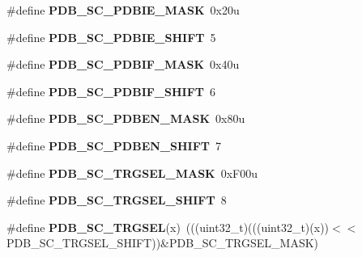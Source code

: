\begin{DoxyCompactItemize}
\item 
\#define {\bfseries P\+D\+B\+\_\+\+S\+C\+\_\+\+P\+D\+B\+I\+E\+\_\+\+M\+A\+SK}~0x20u\hypertarget{group__PDB__Register__Masks_ga153222e454507310871a217b8ede92fd}{}\label{group__PDB__Register__Masks_ga153222e454507310871a217b8ede92fd}

\item 
\#define {\bfseries P\+D\+B\+\_\+\+S\+C\+\_\+\+P\+D\+B\+I\+E\+\_\+\+S\+H\+I\+FT}~5\hypertarget{group__PDB__Register__Masks_ga8632d420c92ec79e08c43f7d3acc79cf}{}\label{group__PDB__Register__Masks_ga8632d420c92ec79e08c43f7d3acc79cf}

\item 
\#define {\bfseries P\+D\+B\+\_\+\+S\+C\+\_\+\+P\+D\+B\+I\+F\+\_\+\+M\+A\+SK}~0x40u\hypertarget{group__PDB__Register__Masks_ga57cd111abf2b5780daddb6619498ef7a}{}\label{group__PDB__Register__Masks_ga57cd111abf2b5780daddb6619498ef7a}

\item 
\#define {\bfseries P\+D\+B\+\_\+\+S\+C\+\_\+\+P\+D\+B\+I\+F\+\_\+\+S\+H\+I\+FT}~6\hypertarget{group__PDB__Register__Masks_ga98ea01f76c8cc1bc944830d4d8387118}{}\label{group__PDB__Register__Masks_ga98ea01f76c8cc1bc944830d4d8387118}

\item 
\#define {\bfseries P\+D\+B\+\_\+\+S\+C\+\_\+\+P\+D\+B\+E\+N\+\_\+\+M\+A\+SK}~0x80u\hypertarget{group__PDB__Register__Masks_ga5582f0b88e7ae5e9dcf69f3a859c4470}{}\label{group__PDB__Register__Masks_ga5582f0b88e7ae5e9dcf69f3a859c4470}

\item 
\#define {\bfseries P\+D\+B\+\_\+\+S\+C\+\_\+\+P\+D\+B\+E\+N\+\_\+\+S\+H\+I\+FT}~7\hypertarget{group__PDB__Register__Masks_ga019fc7af809a6f3945ac3c131b90432a}{}\label{group__PDB__Register__Masks_ga019fc7af809a6f3945ac3c131b90432a}

\item 
\#define {\bfseries P\+D\+B\+\_\+\+S\+C\+\_\+\+T\+R\+G\+S\+E\+L\+\_\+\+M\+A\+SK}~0x\+F00u\hypertarget{group__PDB__Register__Masks_ga8950a99a799e9a49b602a679a64cc2e0}{}\label{group__PDB__Register__Masks_ga8950a99a799e9a49b602a679a64cc2e0}

\item 
\#define {\bfseries P\+D\+B\+\_\+\+S\+C\+\_\+\+T\+R\+G\+S\+E\+L\+\_\+\+S\+H\+I\+FT}~8\hypertarget{group__PDB__Register__Masks_gae206861ff2041634f913c44605459167}{}\label{group__PDB__Register__Masks_gae206861ff2041634f913c44605459167}

\item 
\#define {\bfseries P\+D\+B\+\_\+\+S\+C\+\_\+\+T\+R\+G\+S\+EL}(x)~(((uint32\+\_\+t)(((uint32\+\_\+t)(x))$<$$<$P\+D\+B\+\_\+\+S\+C\+\_\+\+T\+R\+G\+S\+E\+L\+\_\+\+S\+H\+I\+FT))\&P\+D\+B\+\_\+\+S\+C\+\_\+\+T\+R\+G\+S\+E\+L\+\_\+\+M\+A\+SK)\hypertarget{group__PDB__Register__Masks_gad82c5e1b8128b560787b5bdb67a70e5f}{}\label{group__PDB__Register__Masks_gad82c5e1b8128b560787b5bdb67a70e5f}


\end{DoxyCompactItemize}
